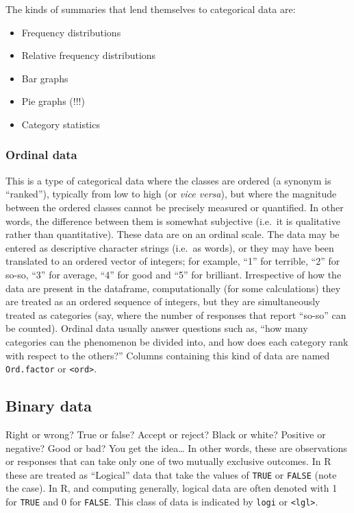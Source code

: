 \documentclass[english,10pt,a4paper,oneside]{book}
\providecommand{\tightlist}{%
  \setlength{\itemsep}{0pt}\setlength{\parskip}{0pt}}
\theoremstyle{definition}
\theoremstyle{definition}
\theoremstyle{definition}
\theoremstyle{remark}
\begin{document}
The kinds of summaries that lend themselves to categorical data are:

\begin{itemize}
\tightlist
\item
  Frequency distributions
\item
  Relative frequency distributions
\item
  Bar graphs
\item
  Pie graphs (!!!)
\item
  Category statistics
\end{itemize}

\hypertarget{ordinal-data}{%
\subsubsection{Ordinal data}\label{ordinal-data}}

This is a type of categorical data where the classes are ordered (a
synonym is \enquote{ranked}), typically from low to high (or \emph{vice
versa}), but where the magnitude between the ordered classes cannot be
precisely measured or quantified. In other words, the difference between
them is somewhat subjective (i.e.~it is qualitative rather than
quantitative). These data are on an ordinal scale. The data may be
entered as descriptive character strings (i.e.~as words), or they may
have been translated to an ordered vector of integers; for example,
\enquote{1} for terrible, \enquote{2} for so-so, \enquote{3} for
average, \enquote{4} for good and \enquote{5} for brilliant.
Irrespective of how the data are present in the dataframe,
computationally (for some calculations) they are treated as an ordered
sequence of integers, but they are simultaneously treated as categories
(say, where the number of responses that report \enquote{so-so} can be
counted). Ordinal data usually answer questions such as, \enquote{how
many categories can the phenomenon be divided into, and how does each
category rank with respect to the others?} Columns containing this kind
of data are named \texttt{Ord.factor} or
\texttt{\textless{}ord\textgreater{}}.

\hypertarget{binary-data}{%
\subsection{Binary data}\label{binary-data}}

Right or wrong? True or false? Accept or reject? Black or white?
Positive or negative? Good or bad? You get the idea\ldots{} In other
words, these are observations or responses that can take only one of two
mutually exclusive outcomes. In R these are treated as \enquote{Logical}
data that take the values of \texttt{TRUE} or \texttt{FALSE} (note the
case). In R, and computing generally, logical data are often denoted
with 1 for \texttt{TRUE} and 0 for \texttt{FALSE}. This class of data is
indicated by \texttt{logi} or \texttt{\textless{}lgl\textgreater{}}.
\end{document}
